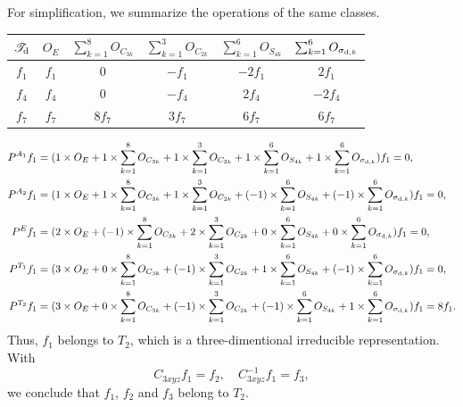 \documentclass[a4paper]{book}
\begin{document}
\begin{solution}
		For simplification, we summarize the operations of the same classes.
		\begin{center}
		\begin{tabular}{cccccc}\hline
	$\mathscr{T}_{\rm d}$ & $O_E$ & $\sum_{k=1}^8 O_{C_{3k}}$ & $\sum_{k=1}^3 O_{C_{2k}}$	& $\sum_{k=1}^6 O_{S_{4k}}$	&	$ \sum_{k=1}^6 O_{\sigma_{{\rm d},k}}$	\\ \hline
		$f_1$	&	$f_1$	&	0	&	$-f_1$	&	$-2f_1$	&	$2f_1$	\\
		$f_4$	&	$f_4$	&	0	&	$-f_4$	&	$2f_4$	&	$-2f_4$	\\
		$f_7$	&	$f_7$	&	$8f_7$	&	$3f_7$	&	$6f_7$	&	$6f_7$	\\ \hline
		\end{tabular}
		\end{center}
		
		\begin{align*}
		P^{A_1} f_1 &= ( 1 \times O_E + 1 \times \sum_{k=1}^8 O_{C_{3k}} + 1 \times \sum_{k=1}^3 O_{C_{2k}} + 1 \times \sum_{k=1}^6 O_{S_{4k}} + 1 \times \sum_{k=1}^6 O_{\sigma_{{\rm d},k}} ) f_1 = 0, \\
		P^{A_2} f_1 &= ( 1 \times O_E + 1 \times \sum_{k=1}^8 O_{C_{3k}} + 1 \times \sum_{k=1}^3 O_{C_{2k}} + (-1) \times \sum_{k=1}^6 O_{S_{4k}} + (-1) \times \sum_{k=1}^6 O_{\sigma_{{\rm d},k}} ) f_1 = 0, \\
		P^E f_1 &= ( 2 \times O_E + (-1) \times \sum_{k=1}^8 O_{C_{3k}} + 2 \times \sum_{k=1}^3 O_{C_{2k}} + 0 \times \sum_{k=1}^6 O_{S_{4k}} + 0 \times \sum_{k=1}^6 O_{\sigma_{{\rm d},k}} ) f_1 = 0, \\
		P^{T_1} f_1 &= ( 3 \times O_E + 0 \times \sum_{k=1}^8 O_{C_{3k}} + (-1) \times \sum_{k=1}^3 O_{C_{2k}} + 1 \times \sum_{k=1}^6 O_{S_{4k}} + (-1) \times \sum_{k=1}^6 O_{\sigma_{{\rm d},k}} ) f_1 = 0, \\
		P^{T_2} f_1 &= ( 3 \times O_E + 0 \times \sum_{k=1}^8 O_{C_{3k}} + (-1) \times \sum_{k=1}^3 O_{C_{2k}} + (-1) \times \sum_{k=1}^6 O_{S_{4k}} + 1 \times \sum_{k=1}^6 O_{\sigma_{{\rm d},k}} ) f_1 = 8f_1. \\
		\end{align*}
		Thus, $f_1$ belongs to $T_2$, which is a three-dimentional irreducible representation. With
		\begin{equation*}
			C_{3xyz} f_1 = f_2, \quad C^{-1}_{3xyz} f_1 = f_3,
		\end{equation*}
		we conclude that $f_1$, $f_2$ and $f_3$ belong to $T_2$.
		

\end{solution}
\end{document}
